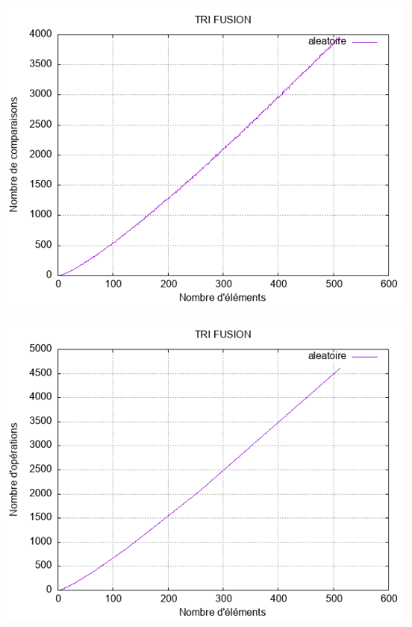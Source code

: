 \documentclass[11pt]{article}
\begin{document}
\begin{center}
\includegraphics[scale=0.6]{images/tri_fusion_comp.png}
\end{center}

\begin{center}
\includegraphics[scale=0.6]{images/tri_fusion_ope.png}
\end{center}
\end{document}

